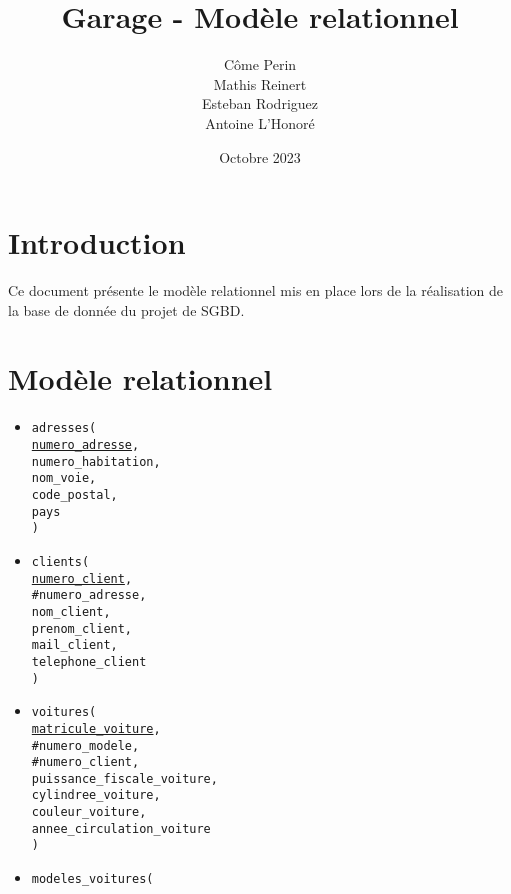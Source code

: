 \documentclass[a4paper,11pt]{article} %
\title{Garage - Modèle relationnel}
\author{Côme Perin \\
        Mathis Reinert \\
        Esteban Rodriguez \\
        Antoine L'Honoré}
\date{Octobre 2023}
\begin{document}
\maketitle

\section{Introduction}
Ce document présente le modèle relationnel mis en place lors de la réalisation de la base de donnée du projet de SGBD.

\section{Modèle relationnel}
\fontsize{9pt}{10.8pt}\selectfont

\begin{itemize}[leftmargin=*]
    \item \texttt{adresses( \\
        \underline{numero\_adresse}, \\
        numero\_habitation, \\
        nom\_voie, \\
        code\_postal, \\
        pays \\
    )}
    \item \texttt{clients( \\
        \underline{numero\_client}, \\
        \#numero\_adresse, \\
        nom\_client, \\
        prenom\_client, \\
        mail\_client, \\
        telephone\_client \\
    )}
    \item \texttt{voitures( \\
        \underline{matricule\_voiture}, \\
        \#numero\_modele, \\
        \#numero\_client,    \\
        puissance\_fiscale\_voiture, \\
        cylindree\_voiture, \\
        couleur\_voiture, \\
        annee\_circulation\_voiture \\
    )}
    \item \texttt{modeles\_voitures( \\
}
\end{itemize}
\end{document}
